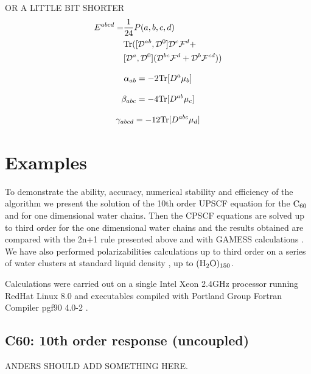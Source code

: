 \documentclass[prl,aps,twocolumn,showpacs,twocolumngrid,superbib]{revtex4}
\def\Tr{{\rm Tr}}
\def\F{\mathcal{F}}
\def\D{\mathcal{D}}
\begin{document}
OR A LITTLE BIT SHORTER
\begin{equation}
  \begin{split}
    E^{abcd}=&\frac{1}{24}P(a,b,c,d) \\
    &\Tr([\D^{ab},\D^0] \D^c \F^d + \\ 
    &[\D^a,\D^0](\D^{bc} \F^d +\D^b \F^{cd}))
  \end{split}
\end{equation}

\begin{equation}
  \alpha_{ab}=-2\Tr[D^a\mu_b]
\end{equation}

\begin{equation}
  \beta_{abc}=-4\Tr[D^{ab}\mu_c]
\end{equation}

\begin{equation}
  \gamma_{abcd}=-12\Tr[D^{abc}\mu_d]
\end{equation}


\section{Examples}
To demonstrate the ability, accuracy, numerical stability and efficiency 
of the algorithm we present
the solution of the 10th order UPSCF equation for the $\rm C_{60}$ and for one 
dimensional water chains. 
Then the CPSCF equations are solved up to third order for the one dimensional 
water chains and the results obtained are compared with the 2n+1 rule presented 
above and with GAMESS calculations \cite{gamess}. We have also performed polarizabilities
calculations up to third order on a series of water clusters at standard 
liquid density \cite{MChallacombe97,ESchwegler97}, up to $(\rm H_2O)_{150}$. 

Calculations were carried out on a single Intel Xeon 2.4GHz processor 
running RedHat Linux 8.0 and  executables compiled
with Portland Group Fortran Compiler pgf90 4.0-2 \cite{PGF90}.



\subsection{C60: 10th order response (uncoupled)}
ANDERS SHOULD ADD SOMETHING HERE.

\end{document}
